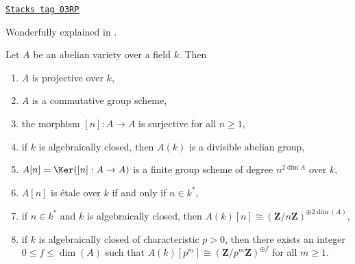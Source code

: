 \begin{proposition}
\label{groupoids-proposition-review-abelian-varieties}
\href{https://stacks.math.columbia.edu/tag/03RP}{\texttt{Stacks tag 03RP}}

\begin{reference}
Wonderfully explained in \cite{AVar}.
\end{reference}
Let $A$ be an abelian variety over a field $k$. Then
\begin{enumerate}
\item $A$ is projective over $k$,
\item $A$ is a commutative group scheme,
\item the morphism $[n] : A \to A$ is surjective for all $n \geq 1$,
\item if $k$ is algebraically closed, then $A(k)$ is a divisible abelian group,
\item $A[n] = \Ker([n] : A \to A)$ is a finite group scheme of degree
$n^{2\dim A}$ over $k$,
\item $A[n]$ is \'etale over $k$ if and only if $n \in k^*$,
\item if $n \in k^*$ and $k$ is algebraically closed,
then $A(k)[n] \cong (\mathbf{Z}/n\mathbf{Z})^{\oplus 2\dim(A)}$,
\item if $k$ is algebraically closed of characteristic $p > 0$, then
there exists an integer $0 \leq f \leq \dim(A)$ such that
$A(k)[p^m] \cong (\mathbf{Z}/p^m\mathbf{Z})^{\oplus f}$
for all $m \geq 1$.
\end{enumerate}
\end{proposition}

